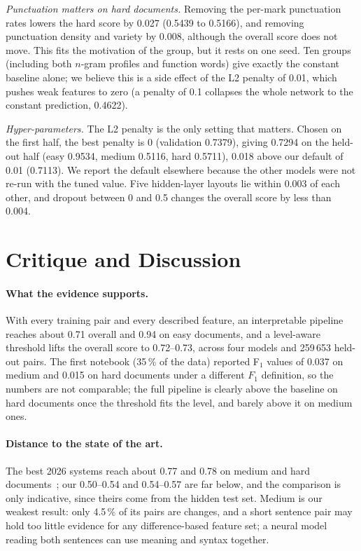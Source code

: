 \documentclass[runningheads]{llncs}
\begin{document}
\emph{Punctuation matters on hard documents.} Removing the per-mark punctuation rates lowers the hard score by 0.027 (0.5439 to 0.5166), and removing punctuation density and variety by 0.008, although the overall score does not move. This fits the motivation of the group, but it rests on one seed. Ten groups (including both $n$-gram profiles and function words) give exactly the constant baseline alone; we believe this is a side effect of the L2 penalty of 0.01, which pushes weak features to zero (a penalty of 0.1 collapses the whole network to the constant prediction, 0.4622).

\emph{Hyper-parameters.} The L2 penalty is the only setting that matters. Chosen on the first half, the best penalty is 0 (validation 0.7379), giving 0.7294 on the held-out half (easy 0.9534, medium 0.5116, hard 0.5711), 0.018 above our default of 0.01 (0.7113). We report the default elsewhere because the other models were not re-run with the tuned value. Five hidden-layer layouts lie within 0.003 of each other, and dropout between 0 and 0.5 changes the overall score by less than 0.004.

\section{Critique and Discussion}
\label{sec:discussion}

\paragraph{What the evidence supports.} With every training pair and every described feature, an interpretable pipeline reaches about 0.71 overall and 0.94 on easy documents, and a level-aware threshold lifts the overall score to 0.72--0.73, across four models and 259\,653 held-out pairs. The first notebook (35\,\% of the data) reported F$_1$ values of 0.037 on medium and 0.015 on hard documents under a different $F_1$ definition, so the numbers are not comparable; the full pipeline is clearly above the baseline on hard documents once the threshold fits the level, and barely above it on medium ones.

\paragraph{Distance to the state of the art.} The best 2026 systems reach about 0.77 and 0.78 on medium and hard documents~\cite{zangerle:2026}; our 0.50--0.54 and 0.54--0.57 are far below, and the comparison is only indicative, since theirs come from the hidden test set. Medium is our weakest result: only 4.5\,\% of its pairs are changes, and a short sentence pair may hold too little evidence for any difference-based feature set; a neural model reading both sentences can use meaning and syntax together.
\end{document}

